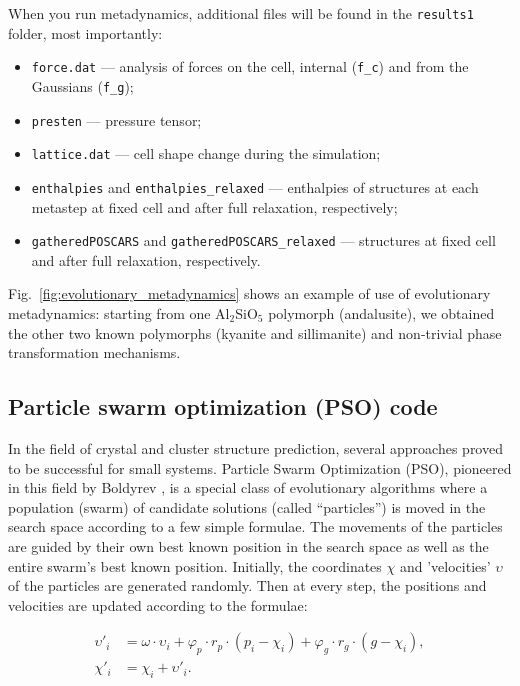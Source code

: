 \documentclass[12pt]{article}
\newcommand{\keyword}[1]{\texttt{#1}}
\newcommand{\file}[1]{\texttt{#1}}
\begin{document}
When you run metadynamics, additional files will be found in the \file{results1}
folder, most importantly:

\begin{itemize}
  \item \file{force.dat} --- analysis of forces on the cell, internal
  (\keyword{f\_c}) and from the Gaussians (\keyword{f\_g});
  \item \file{presten} --- pressure tensor;
  \item \file{lattice.dat}  --- cell shape change during the simulation;
  \item \file{enthalpies} and \file{enthalpies\_relaxed} --- enthalpies of
  structures at each metastep at fixed cell and after full relaxation,
  respectively;
  \item \file{gatheredPOSCARS} and \file{gatheredPOSCARS\_relaxed} ---
  structures at fixed cell and after full relaxation, respectively.
\end{itemize}

Fig.~\ref{fig:evolutionary_metadynamics} shows an example of use of evolutionary
metadynamics: starting from one Al$_2$SiO$_5$ polymorph (andalusite), we
obtained the other two known polymorphs (kyanite and sillimanite) and
non-trivial phase transformation mechanisms.


\subsection{Particle swarm optimization (PSO) code} \label{pso}

In the field of crystal and cluster structure prediction, several approaches
proved to be successful for small systems. Particle Swarm Optimization (PSO),
pioneered in this field by Boldyrev \cite{Boldyrev2007}, is a special class of
evolutionary algorithms where a population (swarm) of candidate solutions
(called ``particles'') is moved in the search space according to a few simple
formulae. The movements of the particles are guided by their own best known
position in the search space as well as the entire swarm's best known position.
Initially, the coordinates $\chi$ and 'velocities' $\upsilon$ of the particles
are generated randomly. Then at every step, the positions and velocities are
updated according to the formulae:

\begin{equation}\label{eq:pso}
\begin{aligned}
\upsilon'_{i} &= \omega \cdot \upsilon_{i} + \varphi_{p} \cdot r_{p} \cdot
(p_{i} - \chi_{i}) + \varphi_{g} \cdot r_{g} \cdot (g - \chi_{i}),\\
\chi'_{i} &= \chi_{i} + \upsilon'_{i}.
\end{aligned}
\end{equation}
\end{document}
